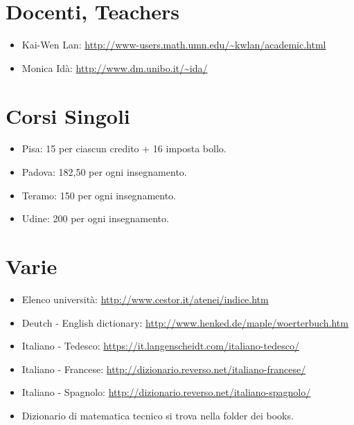 \section{Docenti, Teachers}
\begin{itemize}
 \item Kai-Wen Lan: \url{http://www-users.math.umn.edu/~kwlan/academic.html}
 \item Monica Idà: \url{http://www.dm.unibo.it/~ida/}
\end{itemize}


\section{Corsi Singoli}
\begin{itemize}
 \item Pisa: 15 per ciascun credito + 16 imposta bollo.
 \item Padova: 182,50 per ogni insegnamento.
 \item Teramo: 150 per ogni insegnamento.
 \item Udine: 200 per ogni insegnamento. 
\end{itemize}

\section{Varie}
\begin{itemize}
 \item Elenco università: \url{http://www.cestor.it/atenei/indice.htm}
 \item Deutch - English dictionary: \url{http://www.henked.de/maple/woerterbuch.htm}
 \item Italiano - Tedesco: \url{https://it.langenscheidt.com/italiano-tedesco/}
 \item Italiano - Francese: \url{http://dizionario.reverso.net/italiano-francese/}
 \item Italiano - Spagnolo: \url{http://dizionario.reverso.net/italiano-spagnolo/}
 \item Dizionario di matematica tecnico si trova nella folder dei books.
\end{itemize}



